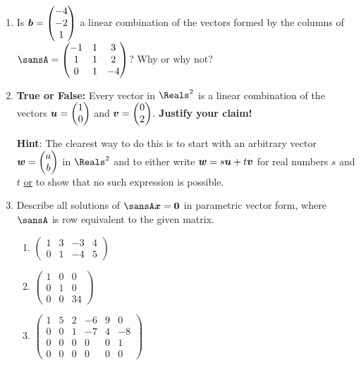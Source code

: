 \documentclass[12 pt]{article}
\newcommand{\hint}[1]{\vspace{3mm}\textbf{Hint}: #1}
\newcommand{\pmat}[1]{\begin{pmatrix}#1\end{pmatrix}}
\begin{document}
\begin{enumerate}[leftmargin=0in, rightmargin=-0.25in]
	\item Is $\vect{b}=\pmat{-4 \\ -2 \\ 1}$ a linear combination of the vectors formed by the columns of \mbox{$\sansA=\pmat{-1 & 1 & 3 \\ 1 & 1 & 2 \\ 0 & 1 & -4}$}? Why or why not?\vspace{0.375in}
	
	\item \textbf{True or False:} Every vector in $\Reals^2$ is a linear combination of the vectors $\vect{u}=\pmat{1 \\ 0}$ and $\vect{v}=\pmat{0 \\ 2}$. \textbf{Justify your claim!}
	
	\hint{The clearest way to do this is to start with an arbitrary vector $\vect{w}=\pmat{a \\ b}$ in $\Reals^2$ and to either write $\boldsymbol{w}=s\boldsymbol{u}+t\boldsymbol{v}$ for real numbers $s$ and $t$ \ul{or} to show that no such expression is possible.}\vspace{0.375in}
	
	\item Describe all solutions of $\sansA\vect{x}=\vect{0}$ in parametric vector form, where $\sansA$ is row equivalent to the given matrix.
	\begin{enumerate}
		\item $\pmat{1 & 3 & -3 & 4 \\ 0 & 1 & -4 & 5}$
		\item $\pmat{1 & 0 & 0 \\ 0 & 1 & 0 \\ 0 & 0 & 34}$
		\item $\pmat{1 & 5 & 2 & -6 & 9 & 0 \\ 0 & 0 & 1 & -7 & 4 & -8 \\ 0 & 0 & 0 & 0 & 0 & 1 \\ 0 & 0 & 0 & 0 & 0 & 0}$
	\end{enumerate}	
	

\end{enumerate}
\end{document}
